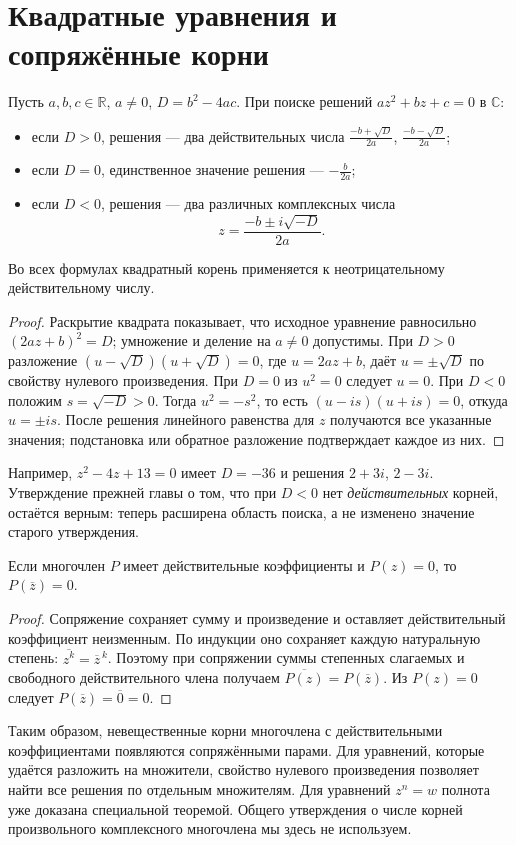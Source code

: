 \section{Квадратные уравнения и сопряжённые корни}
\begin{theorem}\label{thm:legacy-c23-8}
Пусть \(a,b,c\in\mathbb R\), \(a\ne0\), \(D=b^2-4ac\). При поиске решений \(az^2+bz+c=0\) в \(\mathbb C\):
\begin{itemize}[leftmargin=1.5em,itemsep=3pt]
\item если \(D>0\), решения — два действительных числа \(\frac{-b+\sqrt D}{2a}\), \(\frac{-b-\sqrt D}{2a}\);
\item если \(D=0\), единственное значение решения — \(-\frac b{2a}\);
\item если \(D<0\), решения — два различных комплексных числа
\[
z=\frac{-b\pm i\sqrt{-D}}{2a}.
\]
\end{itemize}
Во всех формулах квадратный корень применяется к неотрицательному действительному числу.
\end{theorem}
\begin{proof}
Раскрытие квадрата показывает, что исходное уравнение равносильно \((2az+b)^2=D\); умножение и деление на \(a\ne0\) допустимы. При \(D>0\) разложение \((u-\sqrt D)(u+\sqrt D)=0\), где \(u=2az+b\), даёт \(u=\pm\sqrt D\) по свойству нулевого произведения. При \(D=0\) из \(u^2=0\) следует \(u=0\). При \(D<0\) положим \(s=\sqrt{-D}>0\). Тогда \(u^2=-s^2\), то есть \((u-is)(u+is)=0\), откуда \(u=\pm is\). После решения линейного равенства для \(z\) получаются все указанные значения; подстановка или обратное разложение подтверждает каждое из них.
\end{proof}
Например, \(z^2-4z+13=0\) имеет \(D=-36\) и решения \(2+3i\), \(2-3i\). Утверждение прежней главы о том, что при \(D<0\) нет \emph{действительных} корней, остаётся верным: теперь расширена область поиска, а не изменено значение старого утверждения.

\begin{theorem}\label{thm:legacy-c23-9}
Если многочлен \(P\) имеет действительные коэффициенты и \(P(z)=0\), то \(P(\overline z)=0\).
\end{theorem}
\begin{proof}
Сопряжение сохраняет сумму и произведение и оставляет действительный коэффициент неизменным. По индукции оно сохраняет каждую натуральную степень: \(\overline{z^k}=\overline z^{\,k}\). Поэтому при сопряжении суммы степенных слагаемых и свободного действительного члена получаем \(\overline{P(z)}=P(\overline z)\). Из \(P(z)=0\) следует \(P(\overline z)=\overline0=0\).
\end{proof}
Таким образом, невещественные корни многочлена с действительными коэффициентами появляются сопряжёнными парами. Для уравнений, которые удаётся разложить на множители, свойство нулевого произведения позволяет найти все решения по отдельным множителям. Для уравнений \(z^n=w\) полнота уже доказана специальной теоремой. Общего утверждения о числе корней произвольного комплексного многочлена мы здесь не используем.


